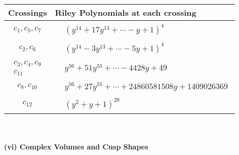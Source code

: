 \documentclass[1p]{elsarticle_modified}
\theoremstyle{definition}
\begin{document}
\begin{tabular}{m{50pt}|m{274pt}}
Crossings & \hspace{64pt}Riley Polynomials at each crossing \\
\hline $$\begin{aligned}c_{1},c_{5},c_{7}\end{aligned}$$&$\begin{aligned}
&(y^{14}+17 y^{13}+\cdots- y+1)^{4}
\end{aligned}$\\
\hline $$\begin{aligned}c_{2},c_{6}\end{aligned}$$&$\begin{aligned}
&(y^{14}-3 y^{13}+\cdots-5 y+1)^{4}
\end{aligned}$\\
\hline $$\begin{aligned}c_{3},c_{4},c_{9}\\c_{11}\end{aligned}$$&$\begin{aligned}
&y^{56}+51 y^{55}+\cdots-4428 y+49
\end{aligned}$\\
\hline $$\begin{aligned}c_{8},c_{10}\end{aligned}$$&$\begin{aligned}
&y^{56}+27 y^{55}+\cdots+24860581508 y+1409026369
\end{aligned}$\\
\hline $$\begin{aligned}c_{12}\end{aligned}$$&$\begin{aligned}
&(y^2+y+1)^{28}
\end{aligned}$\\
\hline
\end{tabular}\\~\\
\newpage\flushleft \textbf{(vi) Complex Volumes and Cusp Shapes}
\end{document}
